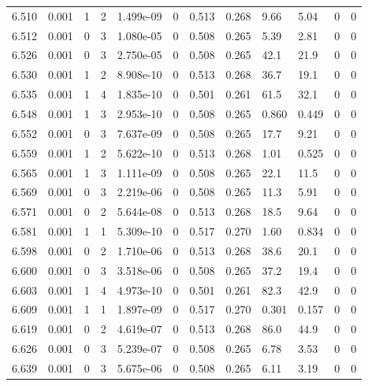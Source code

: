 \documentclass[preview]{standalone}
\begin{document}
{{{{{{{{{{{{{{{{{{\begin{tabular}{L{1.2cm}C{1.2cm} C{0.3cm}C{0.5cm} C{1.4cm}C{1.4cm} C{1.4cm}C{1.4cm} C{1.6cm}C{1.6cm} C{1.6cm}C{1.6cm}}
  6.510  &  0.001  & 1     &  2 &  1.499e-09  & 0  &  0.513&   0.268& 9.66 & 5.04   &  0 & 0  \\ 
  6.512  &  0.001  & 0     &  3 &  1.080e-05  & 0  &  0.508&   0.265& 5.39 & 2.81   &  0 & 0  \\ 
  6.526  &  0.001  & 0     &  3 &  2.750e-05  & 0  &  0.508&   0.265& 42.1 & 21.9   &  0 & 0  \\ 
  6.530  &  0.001  & 1     &  2 &  8.908e-10  & 0  &  0.513&   0.268& 36.7 & 19.1   &  0 & 0  \\ 
  6.535  &  0.001  & 1     &  4 &  1.835e-10  & 0  &  0.501&   0.261& 61.5 & 32.1   &  0 & 0  \\ 
  6.548  &  0.001  & 1     &  3 &  2.953e-10  & 0  &  0.508&   0.265& 0.860 & 0.449   &  0 & 0  \\ 
  6.552  &  0.001  & 0     &  3 &  7.637e-09  & 0  &  0.508&   0.265& 17.7 & 9.21   &  0 & 0  \\ 
  6.559  &  0.001  & 1     &  2 &  5.622e-10  & 0  &  0.513&   0.268& 1.01 & 0.525   &  0 & 0  \\ 
  6.565  &  0.001  & 1     &  3 &  1.111e-09  & 0  &  0.508&   0.265& 22.1 & 11.5   &  0 & 0  \\ 
  6.569  &  0.001  & 0     &  3 &  2.219e-06  & 0  &  0.508&   0.265& 11.3 & 5.91   &  0 & 0  \\ 
  6.571  &  0.001  & 0     &  2 &  5.644e-08  & 0  &  0.513&   0.268& 18.5 & 9.64   &  0 & 0  \\ 
  6.581  &  0.001  & 1     &  1 &  5.309e-10  & 0  &  0.517&   0.270& 1.60 & 0.834   &  0 & 0  \\ 
  6.598  &  0.001  & 0     &  2 &  1.710e-06  & 0  &  0.513&   0.268& 38.6 & 20.1   &  0 & 0  \\ 
  6.600  &  0.001  & 0     &  3 &  3.518e-06  & 0  &  0.508&   0.265& 37.2 & 19.4   &  0 & 0  \\ 
  6.603  &  0.001  & 1     &  4 &  4.973e-10  & 0  &  0.501&   0.261& 82.3 & 42.9   &  0 & 0  \\ 
  6.609  &  0.001  & 1     &  1 &  1.897e-09  & 0  &  0.517&   0.270& 0.301 & 0.157   &  0 & 0  \\ 
  6.619  &  0.001  & 0     &  2 &  4.619e-07  & 0  &  0.513&   0.268& 86.0 & 44.9   &  0 & 0  \\ 
  6.626  &  0.001  & 0     &  3 &  5.239e-07  & 0  &  0.508&   0.265& 6.78 & 3.53   &  0 & 0  \\ 
  6.639  &  0.001  & 0     &  3 &  5.675e-06  & 0  &  0.508&   0.265& 6.11 & 3.19   &  0 & 0  \\ 

\end{tabular}}}}}}}}}}}}}}}}}}}
\end{document}
